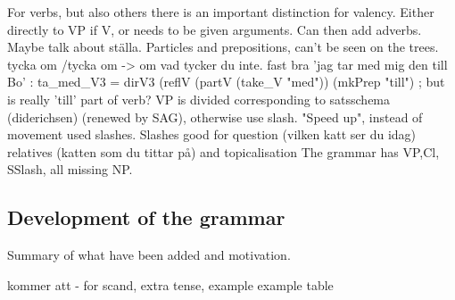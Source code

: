 \documentclass{report}
\begin{document}
For verbs, but also others there is an important distinction for valency.
Either directly to VP if V, or needs to be given arguments. Can then add adverbs.
Maybe talk about ställa.
Particles and prepositions, can't be seen on the trees.
tycka om /tycka om -> om vad tycker du inte. fast bra
'jag tar med mig den till Bo' : ta\_med\_V3 = dirV3 (reflV (partV (take\_V "med")) (mkPrep "till") ;
but is really 'till' part of verb?
VP is divided corresponding to satsschema (diderichsen) (renewed by SAG),
otherwise use slash.
"Speed up", instead of movement used slashes\cite{gazdar}.
Slashes good for question (vilken katt ser du idag)
relatives (katten som du tittar på) and topicalisation
The grammar has VP,Cl, SSlash, all missing NP.



\subsection{Development of the grammar}
\label{sec:Added}
Summary of what have been added and motivation.

kommer att - for scand, extra tense, example
example table

\end{document}
